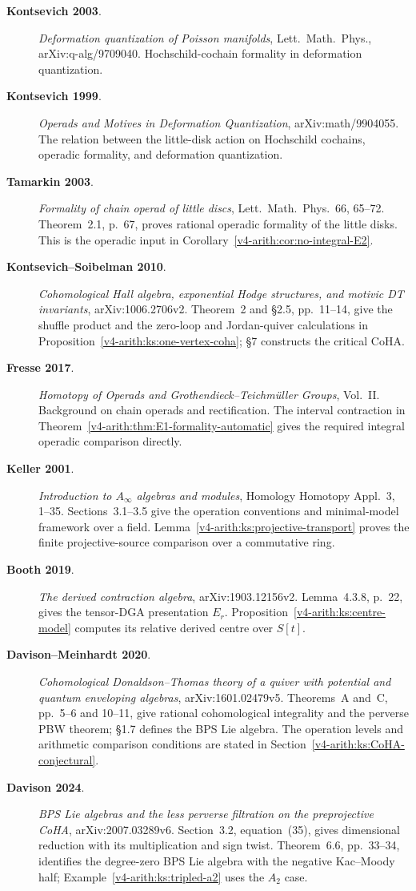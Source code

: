 \begin{description}
\item[\textbf{Kontsevich 2003}.] \emph{Deformation quantization of
Poisson manifolds}, Lett.~Math.~Phys., arXiv:q-alg/9709040.
Hochschild-cochain formality in deformation quantization.
\item[\textbf{Kontsevich 1999}.] \emph{Operads and Motives in
Deformation Quantization}, arXiv:math/9904055.
The relation between the little-disk action on Hochschild cochains,
operadic formality, and deformation quantization.
\item[\textbf{Tamarkin 2003}.] \emph{Formality of chain operad of little discs},
Lett.~Math.~Phys.~66, 65--72. Theorem~2.1, p.~67, proves rational
operadic formality of the little disks. This is the operadic input in
Corollary~\ref{v4-arith:cor:no-integral-E2}.
\item[\textbf{Kontsevich--Soibelman 2010}.] \emph{Cohomological Hall
algebra, exponential Hodge structures, and motivic DT invariants},
arXiv:1006.2706v2. Theorem~2 and \S2.5, pp.~11--14, give the
shuffle product and the zero-loop and Jordan-quiver calculations in
Proposition~\ref{v4-arith:ks:one-vertex-coha}; \S7 constructs the
critical CoHA.
\item[\textbf{Fresse 2017}.] \emph{Homotopy of Operads and
Grothendieck--Teichm\"uller Groups}, Vol.~II.
Background on chain operads and rectification.
The interval contraction in Theorem~\ref{v4-arith:thm:E1-formality-automatic}
gives the required integral operadic comparison directly.
\item[\textbf{Keller 2001}.] \emph{Introduction to $A_\infty$ algebras and modules},
Homology Homotopy Appl.~3, 1--35. Sections~3.1--3.5 give the
operation conventions and minimal-model framework over a field.
Lemma~\ref{v4-arith:ks:projective-transport} proves the finite
projective-source comparison over a commutative ring.
\item[\textbf{Booth 2019}.] \emph{The derived contraction algebra},
arXiv:1903.12156v2. Lemma~4.3.8, p.~22, gives the tensor-DGA
presentation $E_r$. Proposition~\ref{v4-arith:ks:centre-model}
computes its relative derived centre over $S[t]$.
\item[\textbf{Davison--Meinhardt 2020}.]
\emph{Cohomological Donaldson--Thomas theory of a quiver with potential
and quantum enveloping algebras}, arXiv:1601.02479v5.
Theorems~A and~C, pp.~5--6 and 10--11, give rational cohomological
integrality and the perverse PBW theorem; \S1.7 defines the BPS Lie
algebra. The operation levels and arithmetic comparison conditions
are stated in Section~\ref{v4-arith:ks:CoHA-conjectural}.
\item[\textbf{Davison 2024}.]
\emph{BPS Lie algebras and the less perverse filtration on the
preprojective CoHA}, arXiv:2007.03289v6.
Section~3.2, equation~(35), gives dimensional reduction with its
multiplication and sign twist. Theorem~6.6, pp.~33--34, identifies
the degree-zero BPS Lie algebra with the negative Kac--Moody half;
Example~\ref{v4-arith:ks:tripled-a2} uses the $A_2$ case.
\end{description}

